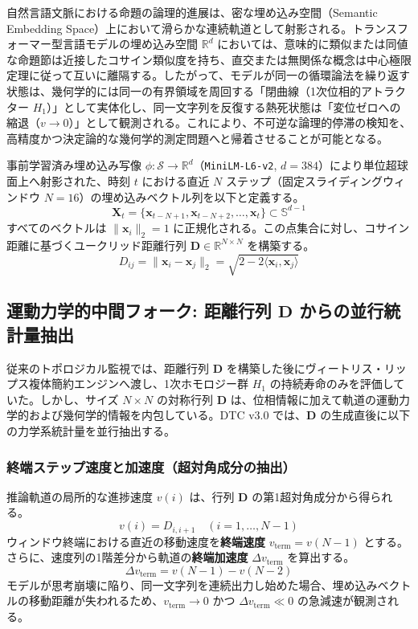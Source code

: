 \documentclass[11pt,a4paper]{article}
\begin{document}
自然言語文脈における命題の論理的進展は、密な埋め込み空間（Semantic Embedding Space）上において滑らかな連続軌道として射影される。トランスフォーマー型言語モデルの埋め込み空間 $\mathbb{R}^d$ においては、意味的に類似または同値な命題節は近接したコサイン類似度を持ち、直交または無関係な概念は中心極限定理に従って互いに離隔する。したがって、モデルが同一の循環論法を繰り返す状態は、幾何学的には同一の有界領域を周回する「閉曲線（1次位相的アトラクター $H_1$）」として実体化し、同一文字列を反復する熱死状態は「変位ゼロへの縮退（$v \to 0$）」として観測される。これにより、不可逆な論理的停滞の検知を、高精度かつ決定論的な幾何学的測定問題へと帰着させることが可能となる。

事前学習済み埋め込み写像 $\phi: \mathcal{S} \to \mathbb{R}^d$（\texttt{MiniLM-L6-v2}, $d=384$）により単位超球面上へ射影された、時刻 $t$ における直近 $N$ ステップ（固定スライディングウィンドウ $N=16$）の埋め込みベクトル列を以下と定義する。
\begin{equation}
\mathbf{X}_t = \{\mathbf{x}_{t-N+1}, \mathbf{x}_{t-N+2}, \dots, \mathbf{x}_t\} \subset \mathbb{S}^{d-1}
\end{equation}
すべてのベクトルは $\|\mathbf{x}_i\|_2 = 1$ に正規化される。この点集合に対し、コサイン距離に基づくユークリッド距離行列 $\mathbf{D} \in \mathbb{R}^{N \times N}$ を構築する。
\begin{equation}
D_{ij} = \|\mathbf{x}_i - \mathbf{x}_j\|_2 = \sqrt{2 - 2 \langle \mathbf{x}_i, \mathbf{x}_j \rangle}
\end{equation}

\subsection{運動力学的中間フォーク: 距離行列 $\mathbf{D}$ からの並行統計量抽出}

従来のトポロジカル監視では、距離行列 $\mathbf{D}$ を構築した後にヴィートリス・リップス複体簡約エンジンへ渡し、1次ホモロジー群 $H_1$ の持続寿命のみを評価していた。しかし、サイズ $N \times N$ の対称行列 $\mathbf{D}$ は、位相情報に加えて軌道の運動力学的および幾何学的情報を内包している。DTC v3.0 では、$\mathbf{D}$ の生成直後に以下の力学系統計量を並行抽出する。

\subsubsection{終端ステップ速度と加速度（超対角成分の抽出）}
推論軌道の局所的な進捗速度 $v(i)$ は、行列 $\mathbf{D}$ の第1超対角成分から得られる。
\begin{equation}
v(i) = D_{i, i+1} \quad (i = 1, \dots, N-1)
\end{equation}
ウィンドウ終端における直近の移動速度を\textbf{終端速度} $v_{\mathrm{term}} = v(N-1)$ とする。さらに、速度列の1階差分から軌道の\textbf{終端加速度} $\Delta v_{\mathrm{term}}$ を算出する。
\begin{equation}
\Delta v_{\mathrm{term}} = v(N-1) - v(N-2)
\end{equation}
モデルが思考崩壊に陥り、同一文字列を連続出力し始めた場合、埋め込みベクトルの移動距離が失われるため、$v_{\mathrm{term}} \to 0$ かつ $\Delta v_{\mathrm{term}} \ll 0$ の急減速が観測される。
\end{document}
